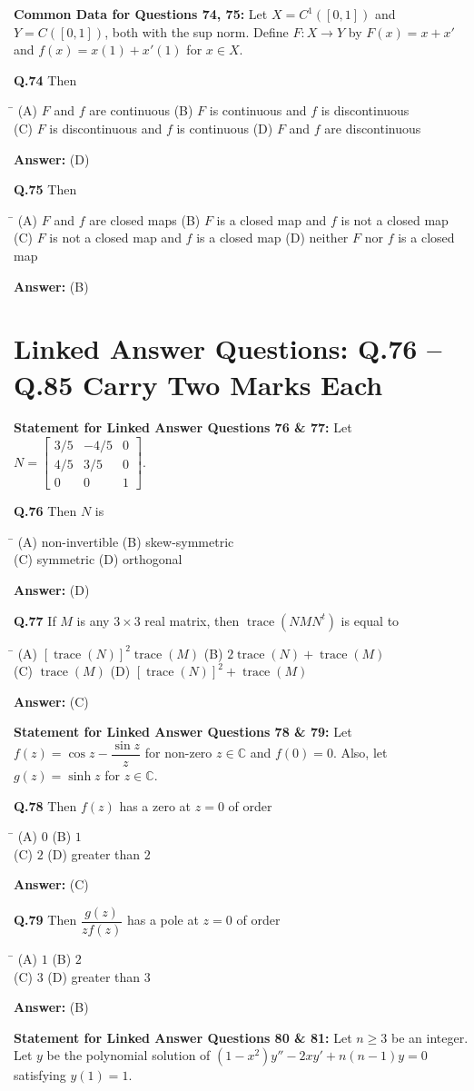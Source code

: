 \documentclass[11pt,a4paper]{article}
\newcommand{\optsfourA}[4]{%
  \begin{tabbing}
    \hspace{0.48\linewidth}\=\kill
    (A) #1 \> (B) #2 \\[2pt]
    (C) #3 \> (D) #4
  \end{tabbing}%
}
\newcommand{\ans}[1]{\textbf{Answer:} #1\par\medskip}
\begin{document}
\medskip
\textbf{Common Data for Questions 74, 75:}
Let $X = C^1([0,1])$ and $Y = C([0,1])$, both with the sup norm. Define $F : X \to Y$ by $F(x) = x + x'$ and $f(x) = x(1) + x'(1)$ for $x \in X$.

\textbf{Q.74} Then
\optsfourA{$F$ and $f$ are continuous}{$F$ is continuous and $f$ is discontinuous}{$F$ is discontinuous and $f$ is continuous}{$F$ and $f$ are discontinuous}
\ans{(D)}

\textbf{Q.75} Then
\optsfourA{$F$ and $f$ are closed maps}{$F$ is a closed map and $f$ is not a closed map}{$F$ is not a closed map and $f$ is a closed map}{neither $F$ nor $f$ is a closed map}
\ans{(B)}

\section*{Linked Answer Questions: Q.76 -- Q.85 Carry Two Marks Each}

\textbf{Statement for Linked Answer Questions 76 \& 77:}
Let $N = \begin{bmatrix} 3/5 & -4/5 & 0 \\ 4/5 & 3/5 & 0 \\ 0 & 0 & 1 \end{bmatrix}$.

\textbf{Q.76} Then $N$ is
\optsfourA{non-invertible}{skew-symmetric}{symmetric}{orthogonal}
\ans{(D)}

\textbf{Q.77} If $M$ is any $3 \times 3$ real matrix, then $\operatorname{trace}(NMN^t)$ is equal to
\optsfourA{$[\operatorname{trace}(N)]^2 \operatorname{trace}(M)$}{$2\operatorname{trace}(N) + \operatorname{trace}(M)$}{$\operatorname{trace}(M)$}{$[\operatorname{trace}(N)]^2 + \operatorname{trace}(M)$}
\ans{(C)}

\medskip
\textbf{Statement for Linked Answer Questions 78 \& 79:}
Let $f(z) = \cos z - \dfrac{\sin z}{z}$ for non-zero $z \in \mathbb{C}$ and $f(0) = 0$. Also, let $g(z) = \sinh z$ for $z \in \mathbb{C}$.

\textbf{Q.78} Then $f(z)$ has a zero at $z = 0$ of order
\optsfourA{$0$}{$1$}{$2$}{greater than $2$}
\ans{(C)}

\textbf{Q.79} Then $\dfrac{g(z)}{zf(z)}$ has a pole at $z = 0$ of order
\optsfourA{$1$}{$2$}{$3$}{greater than $3$}
\ans{(B)}

\medskip
\textbf{Statement for Linked Answer Questions 80 \& 81:}
Let $n \ge 3$ be an integer. Let $y$ be the polynomial solution of $(1 - x^2)y'' - 2xy' + n(n - 1)y = 0$ satisfying $y(1) = 1$.
\end{document}
